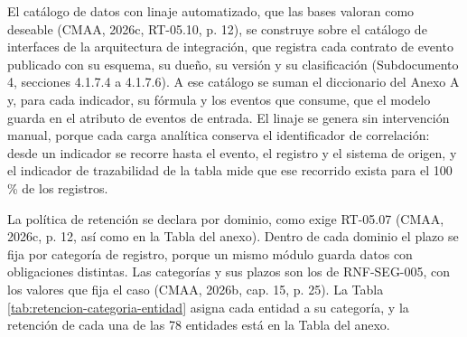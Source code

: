 \documentclass[subdoc]{../../comun/overfore}
\begin{document}
El catálogo de datos con linaje automatizado, que las bases valoran como deseable (CMAA, 2026c, RT-05.10, p. 12), se construye sobre el catálogo de interfaces de la arquitectura de integración, que registra cada contrato de evento publicado con su esquema, su dueño, su versión y su clasificación (Subdocumento 4, secciones 4.1.7.4 a 4.1.7.6). A ese catálogo se suman el diccionario del Anexo A y, para cada indicador, su fórmula y los eventos que consume, que el modelo guarda en el atributo de eventos de entrada. El linaje se genera sin intervención manual, porque cada carga analítica conserva el identificador de correlación: desde un indicador se recorre hasta el evento, el registro y el sistema de origen, y el indicador de trazabilidad de la tabla mide que ese recorrido exista para el 100 \% de los registros.

La política de retención se declara por dominio, como exige RT-05.07 (CMAA, 2026c, p. 12, así como en la Tabla  del anexo). Dentro de cada dominio el plazo se fija por categoría de registro, porque un mismo módulo guarda datos con obligaciones distintas. Las categorías y sus plazos son los de RNF-SEG-005, con los valores que fija el caso (CMAA, 2026b, cap. 15, p. 25). La Tabla \ref{tab:retencion-categoria-entidad} asigna cada entidad a su categoría, y la retención de cada una de las 78 entidades está en la Tabla  del anexo.
\end{document}
